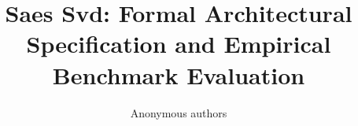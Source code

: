 \title{\textbf{Saes Svd: Formal Architectural Specification and Empirical Benchmark Evaluation}}

\author{Anonymous authors}
